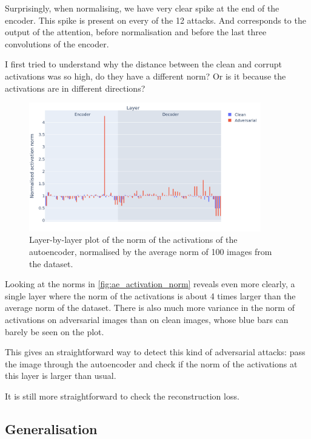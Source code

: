 \documentclass[]{scrarticle}
\begin{document}
Surprisingly, when normalising, we have very clear spike at the end of the encoder.
This spike is present on every of the 12 attacks.
And corresponds to the output of the attention, before normalisation
and before the last three convolutions of the encoder.

I first tried to understand why the distance between the clean
and corrupt activations was so high, do they have a different norm?
Or is it because the activations are in different directions?

\begin{figure}[h]
  \centering
  \includegraphics[width=0.9\textwidth]{images/ae_activation_norm.png}
  \caption{
    Layer-by-layer plot of the norm of the activations of the autoencoder,
    normalised by the average norm of 100 images from the dataset.
  }
  \label{fig:ae_activation_norm}
\end{figure}

Looking at the norms in \autoref{fig:ae_activation_norm} reveals
even more clearly, a single layer where the norm of the activations is about
4 times larger than the average norm of the dataset.
There is also much more variance in the norm of activations
on adversarial images than on clean images, whose blue
bars can barely be seen on the plot.

This gives an straightforward way to detect this kind of adversarial
attacks: pass the image through the autoencoder and check if the
norm of the activations at this layer is larger than usual.


\begin{remark}
  It is still more straightforward to check the reconstruction loss.
\end{remark}

\subsection{Generalisation}
\end{document}
